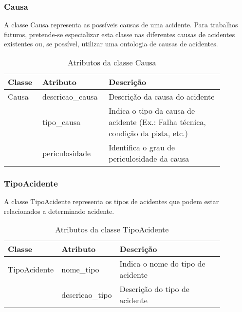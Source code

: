 \subsubsection*{\textbf{Causa}}

  A classe Causa representa as possíveis causas de uma acidente. Para trabalhos futuros, pretende-se especializar esta classe 
  nas diferentes causas de acidentes existentes ou, se possível, utilizar uma ontologia de causas de acidentes.
  
    \begin{table*}[!h]
    \centering
    \begin{tabular}{p{0.15\linewidth}p{0.23\linewidth}p{0.5\linewidth}}
      \hline
      \textbf{Classe} & \textbf{Atributo} & \textbf{Descrição}\\
      \hline
	Causa & descricao\_causa & Descrição da causa do acidente\\
	      & tipo\_causa & Indica o tipo da causa de acidente (Ex.: Falha técnica, condição da pista, etc.)\\
	      & periculosidade & Identifica o grau de periculosidade da causa\\
      \hline
    \end{tabular}
    \caption{Atributos da classe Causa}
    \label{tab:attr_causa}
    \end{table*}      
    
\subsubsection*{\textbf{TipoAcidente}}

  A classe TipoAcidente representa os tipos de acidentes que podem estar relacionados a determinado acidente.
  
    \begin{table*}[!h]
    \centering
    \begin{tabular}{p{0.15\linewidth}p{0.23\linewidth}p{0.5\linewidth}}
      \hline
      \textbf{Classe} & \textbf{Atributo} & \textbf{Descrição}\\
      \hline
	TipoAcidente & nome\_tipo & Indica o nome do tipo de acidente\\
		     & descricao\_tipo & Descrição do tipo de acidente\\
      \hline
    \end{tabular}
    \caption{Atributos da classe TipoAcidente}
    \label{tab:attr_tipo_acidente}
    \end{table*}
    
